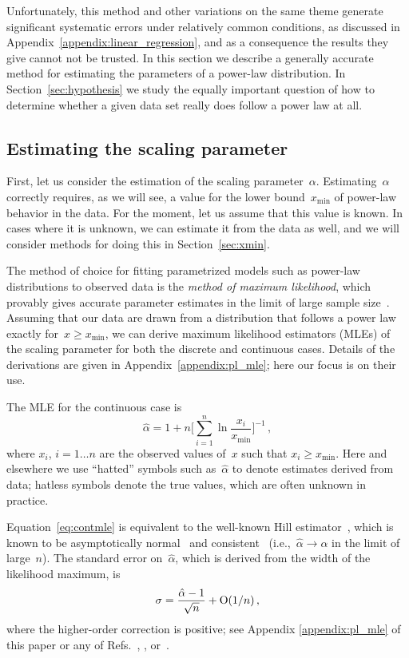 \documentclass[final]{siamltex}
\newcommand{\defn}{\textit}
\newcommand{\Ord}{\mathrm{O}}
\newcommand{\xmin}{\ensuremath{x_{\min}}}
\newcommand{\punctspace}{\,}
\begin{document}
Unfortunately, this method and other variations on the same theme generate
significant systematic errors under relatively common conditions, as
discussed in Appendix~\ref{appendix:linear_regression}, and as a
consequence the results they give cannot not be trusted.  In this section
we describe a generally accurate method for estimating the parameters of a
power-law distribution.  In Section~\ref{sec:hypothesis} we study the
equally important question of how to determine whether a given data set
really does follow a power law at all.


\subsection{Estimating the scaling parameter}
\label{sec:estalpha}
First, let us consider the estimation of the scaling parameter~$\alpha$.
Estimating~$\alpha$ correctly requires, as we will see, a value for the
lower bound~$\xmin$ of power-law behavior in the data.  For the moment, let
us assume that this value is known.  In cases where it is unknown, we can
estimate it from the data as well, and we will consider methods for doing
this in Section~\ref{sec:xmin}.

The method of choice for fitting parametrized models such as power-law
distributions to observed data is the \defn{method of maximum likelihood},
which provably gives accurate parameter estimates in the limit of large
sample size~\cite{Wasserman-all-of-stats,%
 Barndorff-Nielsen-and-Cox-inference-and-asymptotics}.  Assuming that our
data are drawn from a distribution that follows a power law exactly
for~$x\ge \xmin$, we can derive maximum likelihood estimators (MLEs) of the
scaling parameter for both the discrete and continuous cases.  Details of
the derivations are given in Appendix~\ref{appendix:pl_mle}; here our focus
is on their use.

The MLE for the continuous case is~\cite{Muniruzzaman-on-Pareto}
\begin{equation}
\hat{\alpha} = 1 + n \Biggl[ \sum_{i=1}^{n}\ln \frac{x_{i}}{\xmin}
                    \Biggr]^{-1}\punctspace,
\label{eq:contmle}
\end{equation}
where $x_i$, $i=1\ldots n$ are the observed values of~$x$ such that
$x_{i}\ge \xmin$.  Here and elsewhere we use ``hatted'' symbols such
as~$\hat{\alpha}$ to denote estimates derived from data; hatless symbols
denote the true values, which are often unknown in practice.

Equation~\eqref{eq:contmle} is equivalent to the well-known Hill
estimator~\cite{Hill75}, which is known to be asymptotically
normal~\cite{Hall82} and consistent~\cite{Mason82}
(i.e.,~$\hat{\alpha}\to\alpha$ in the limit of large~$n$).  The standard
error on~$\hat{\alpha}$, which is derived from the width of the likelihood
maximum, is
\begin{equation}
\label{eq:mle:sigma}
\sigma = {\hat{\alpha}-1\over\sqrt{n}} + \Ord(1/n)\punctspace,
\end{equation}
where the higher-order correction is positive; see Appendix
\ref{appendix:pl_mle} of this paper or any of
Refs.~\cite{Muniruzzaman-on-Pareto}, \cite{MEJN-on-power-laws},
or~\cite{Wheatland04}.
\end{document}
